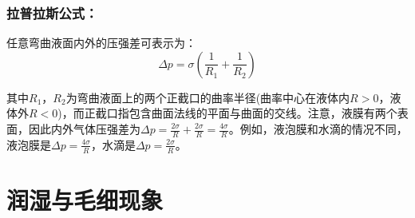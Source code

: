 \documentclass[zihao=-4,UTF8]{report}
\begin{document}
\subsubsection{拉普拉斯公式：}
任意弯曲液面内外的压强差可表示为：
\begin{equation}
    \Delta p = \sigma(\frac{1}{R_1} + \frac{1}{R_2})
\end{equation}
{\par\color{gray}\small
其中$R_1$，$R_2$为弯曲液面上的两个正截口的曲率半径(曲率中心在液体内$R>0$，液体外$R<0$)，而正截口指包含曲面法线的平面与曲面的交线。注意，液膜有两个表面，因此内外气体压强差为{\color{red}$\Delta p =\frac{2\sigma}{R}+\frac{2\sigma}{R} = \frac{4\sigma}{R}$}。例如，液泡膜和水滴的情况不同，液泡膜是$\Delta p = \frac{4\sigma}{R}$，水滴是$\Delta p = \frac{2\sigma}{R}$。
\par}

\section{润湿与毛细现象}
\end{document}

